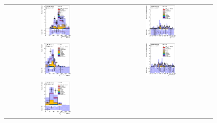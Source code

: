 \clearpage
\begin{figure}[htbp]
\begin{center}
\begin{tabular}{cc}
%
\includegraphics[width=0.30\textwidth]{appendices/figures/sdrs/JetPt1_ELEMUONCR8_1W_NOMINAL.eps} &
\includegraphics[width=0.30\textwidth]{appendices/figures/sdrs/JetEta1_ELEMUONCR8_1W_NOMINAL.eps} \\
\includegraphics[width=0.30\textwidth]{appendices/figures/sdrs/JetPt2_ELEMUONCR8_1W_NOMINAL.eps} &
\includegraphics[width=0.30\textwidth]{appendices/figures/sdrs/JetEta2_ELEMUONCR8_1W_NOMINAL.eps} \\
\includegraphics[width=0.30\textwidth]{appendices/figures/sdrs/JetPt3_ELEMUONCR8_1W_NOMINAL.eps} &

\end{tabular}
\end{center}
\end{figure}

